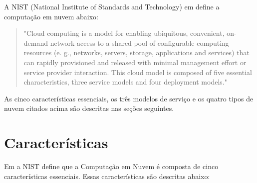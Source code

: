 	A NIST (National Institute of Standards and Technology) em
        \cite{NIST:2011} define a computação em nuvem  abaixo:
	
	\begin{quotation}
		"Cloud computing is a model for enabling ubiquitous,
                convenient, on-demand network access to a shared pool of
                configurable computing resources (e. g., networks, servers,
                storage, applications and services) that can 
                 rapidly
                provisioned and released with minimal management effort or service provider interaction. This cloud model is composed of five essential characteristics, three service models and four deployment models."
	\end{quotation}	
	
	As cinco características essenciais, os três modelos de serviço e os
        quatro tipos de nuvem citados acima são descritas nas seções seguintes.		

\section{Características} \label{cloud:char}
	Em \cite{NIST:2011} a NIST define que a Computação em Nuvem é composta de cinco características essenciais. Essas características são descritas abaixo:   

